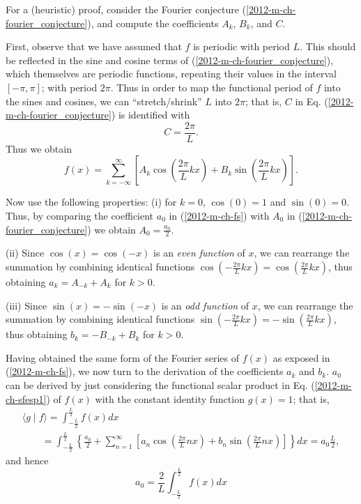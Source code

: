 {\color{OliveGreen}
\bproof

For a (heuristic) proof, consider the Fourier conjecture (\ref{2012-m-ch-fourier_conjecture}),
and compute the coefficients $A_k$, $B_k$, and $C$.

First, observe that we have assumed that $f$ is periodic with period $L$.
This should be reflected in the sine and cosine terms of   (\ref{2012-m-ch-fourier_conjecture}),
which themselves are periodic functions, repeating their values in the interval $[- \pi , \pi ]$; with period $2\pi$.
Thus in order to map the functional period of $f$ into the sines and cosines, we can ``stretch/shrink''
$L$ into $2\pi$; that is,
$C$ in Eq.  (\ref{2012-m-ch-fourier_conjecture}) is identified with
\begin{equation}
C=\frac{2\pi}{L}.
\label{2012-m-ch-pfc1}
\end{equation}
Thus we obtain
\begin{equation}
f(x)= \sum_{k=-\infty}^\infty
\left[ A_k \cos \left(\frac{2\pi}{L} k x\right) + B_k \sin \left(\frac{2\pi}{L} k x\right)\right].
\label{2012-m-ch-pfc2}
\end{equation}

Now use the following properties:
(i)
for $k=0$, $\cos (0)=1$ and $\sin (0)=0$.
Thus, by comparing the coefficient $a_0$ in
(\ref{2012-m-ch-fs}) with $A_0$ in (\ref{2012-m-ch-fourier_conjecture})
we obtain  $A_0=\frac{a_0}{2}$.

(ii) Since $\cos (x)= \cos (-x)$ is an {\em even function} of $x$, we can rearrange the summation
by combining identical functions  $\cos (-\frac{2\pi}{L} k x) = \cos (\frac{2\pi}{L} k x) $,
thus obtaining $a_k = A_{-k}+A_k$ for $k>0$.

(iii) Since $\sin (x)= -\sin (-x)$ is an {\em odd function} of $x$, we can rearrange the summation
by combining identical functions  $\sin (-\frac{2\pi}{L} k x) =  -\sin (\frac{2\pi}{L} k x)$,
thus obtaining $b_k = -B_{-k}+B_k$ for $k>0$.

Having obtained the same form of the Fourier series of $f(x)$ as exposed in (\ref{2012-m-ch-fs}),
we now turn to the derivation of the coefficients $a_k$ and $b_k$.
$a_0$ can be derived by just considering the functional scalar product in
Eq. (\ref{2012-m-ch-sfesp1})
of $f(x)$ with the constant identity function $g(x)=1$; that is,
\begin{equation}
\begin{split}
\langle   g  \mid f \rangle
=
\int_{-\frac{L}{2}}^\frac{L}{2} f(x)  dx \\
\qquad =
\int_{-\frac{L}{2}}^\frac{L}{2} \left\{ \frac{a_0}{2}+\sum_{n=1}^\infty
\left[a_n\cos\left(\frac{2\pi}{L} n x\right)+b_n\sin\left(\frac{2\pi}{L} n x\right)\right]\right\}  dx  =
a_0\frac{L}{2}
,
\end{split}
\label{2012-m-ch-sfespnn}
\end{equation}
and hence
\begin{equation}
a_0 = \frac{2}{L} \int_{-\frac{L}{2}}^\frac{L}{2} f(x)  dx
\label{2012-m-ch-sfespnn2}
\end{equation}

}
